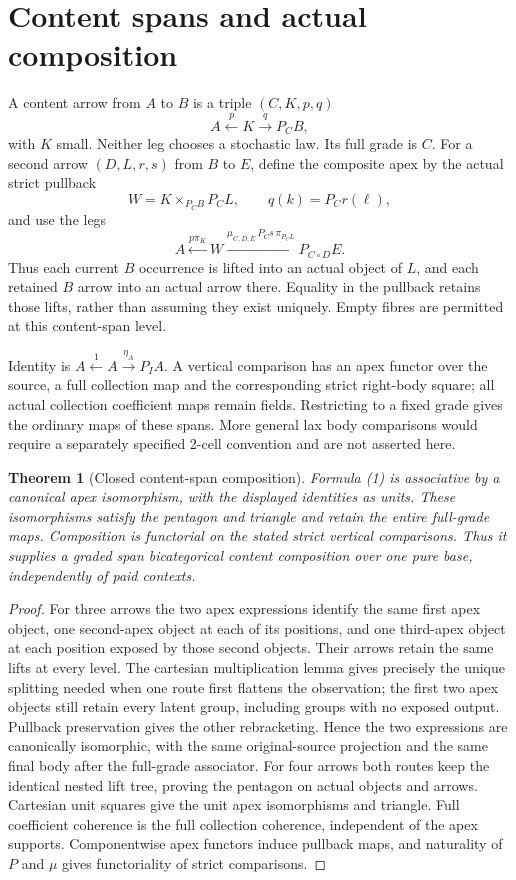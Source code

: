 \documentclass[11pt]{article}
\newtheorem{theorem}{Theorem}\newtheorem{lemma}{Lemma}
\begin{document}
\section{Content spans and actual composition}
A content arrow from $A$ to $B$ is a triple $(C,K,p,q)$
\[
                  A\xleftarrow{p}K\xrightarrow{q}P_CB,
\]
with $K$ small. Neither leg chooses a stochastic law. Its full grade is $C$. For a second arrow $(D,L,r,s)$ from $B$ to $E$, define the composite apex by the actual strict pullback
\[
 W=K\times_{P_CB}P_C L,
 \qquad q(k)=P_Cr(\ell),
\]
and use the legs
\[
 A\xleftarrow{p\pi_K}W
 \xrightarrow{\mu_{C,D,E}\,P_Cs\,\pi_{P_CL}}
 P_{C\circ D}E.                                      \tag{1}
\]
Thus each current $B$ occurrence is lifted into an actual object of $L$, and each retained $B$ arrow into an actual arrow there. Equality in the pullback retains those lifts, rather than assuming they exist uniquely. Empty fibres are permitted at this content-span level.

Identity is $A\xleftarrow{1}A\xrightarrow{\eta_A}P_IA$. A vertical comparison has an apex functor over the source, a full collection map and the corresponding strict right-body square; all actual collection coefficient maps remain fields. Restricting to a fixed grade gives the ordinary maps of these spans. More general lax body comparisons would require a separately specified 2-cell convention and are not asserted here.

\begin{theorem}[Closed content-span composition]
Formula (1) is associative by a canonical apex isomorphism, with the displayed identities as units. These isomorphisms satisfy the pentagon and triangle and retain the entire full-grade maps. Composition is functorial on the stated strict vertical comparisons. Thus it supplies a graded span bicategorical content composition over one pure base, independently of paid contexts.
\end{theorem}
\begin{proof}
For three arrows the two apex expressions identify the same first apex object, one second-apex object at each of its positions, and one third-apex object at each position exposed by those second objects. Their arrows retain the same lifts at every level. The cartesian multiplication lemma gives precisely the unique splitting needed when one route first flattens the observation; the first two apex objects still retain every latent group, including groups with no exposed output. Pullback preservation gives the other rebracketing. Hence the two expressions are canonically isomorphic, with the same original-source projection and the same final body after the full-grade associator. For four arrows both routes keep the identical nested lift tree, proving the pentagon on actual objects and arrows. Cartesian unit squares give the unit apex isomorphisms and triangle. Full coefficient coherence is the full collection coherence, independent of the apex supports. Componentwise apex functors induce pullback maps, and naturality of $P$ and $\mu$ gives functoriality of strict comparisons.\end{proof}
\end{document}
